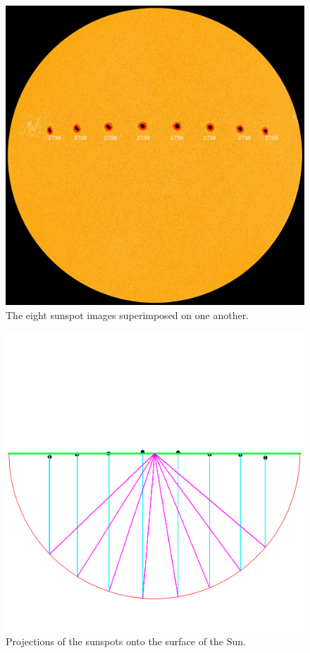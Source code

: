 \documentclass[11pt]{article}
\begin{document}
\begin{figure}[h]
\includegraphics[width=\columnwidth]{figures/sunspots.png}
\caption{The eight sunspot images superimposed on one another.}
\label{img:sunspots}
\end{figure}

\begin{figure}[h]
\includegraphics[width=\columnwidth]{figures/projections.png}
\caption{Projections of the sunspots onto the surface of the Sun.}
\label{img:projections}
\end{figure}
\end{document}
